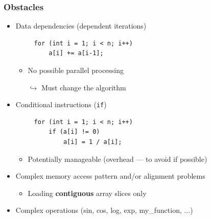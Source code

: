 \documentclass[xcolor={x11names,svgnames}]{beamer}
\newcommand{\red}[1]{{\color{red}#1}}
\begin{document}
\begin{frame}[fragile=singleslide]
  \frametitle{Obstacles}

  \begin{itemize}
  \item Data dependencies (dependent iterations)
     \begin{verbatim}
     for (int i = 1; i < n; i++)
         a[i] += a[i-1];
\end{verbatim}
    \begin{itemize}
    \item No possible parallel processing 
      \item[$\hookrightarrow$] Must change the algorithm
    \end{itemize}

\medskip

\item Conditional instructions (\texttt{if})
     \begin{verbatim}
     for (int i = 1; i < n; i++)
         if (a[i] != 0)
             a[i] = 1 / a[i];
\end{verbatim}
  \begin{itemize}
  \item Potentially manageable (overhead --- to avoid if possible)
  \end{itemize}

  \medskip

\item Complex memory access pattern and/or alignment problems 
  \begin{itemize}
  \item Loading \textbf{contiguous} array slices \red{only}
  \end{itemize}
  
  \medskip

\item Complex operations (sin, cos, log, exp, my\_function, ...)
\end{itemize}
\end{frame}  

\end{document}
